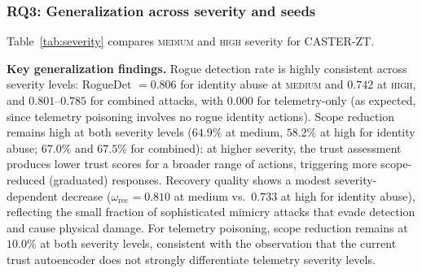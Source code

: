 \documentclass[10pt,journal,compsoc]{IEEEtran}
\begin{document}
\subsubsection{RQ3: Generalization across severity and seeds}

Table~\ref{tab:severity} compares \textsc{medium} and \textsc{high} severity for CASTER-ZT.

\begin{table}[t]
\centering
\caption{CASTER-ZT results across severity levels (mean over 20 seeds).  RogueDet = rogue detection rate; $\omega_{\mathrm{rec}}$ = operational recovery quality.}
\label{tab:severity}
%
\end{table}

\noindent\textbf{Key generalization findings.}
Rogue detection rate is highly consistent across severity levels: RogueDet $= 0.806$ for identity abuse at \textsc{medium} and $0.742$ at \textsc{high}, and $0.801$--$0.785$ for combined attacks, with $0.000$ for telemetry-only (as expected, since telemetry poisoning involves no rogue identity actions).
Scope reduction remains high at both severity levels ($64.9\%$ at medium, $58.2\%$ at high for identity abuse; $67.0\%$ and $67.5\%$ for combined): at higher severity, the trust assessment produces lower trust scores for a broader range of actions, triggering more scope-reduced (graduated) responses.
Recovery quality shows a modest severity-dependent decrease ($\omega_{\mathrm{rec}} = 0.810$ at medium vs.\ $0.733$ at high for identity abuse), reflecting the small fraction of sophisticated mimicry attacks that evade detection and cause physical damage.
For telemetry poisoning, scope reduction remains at $10.0\%$ at both severity levels, consistent with the observation that the current trust autoencoder does not strongly differentiate telemetry severity levels.
\end{document}
